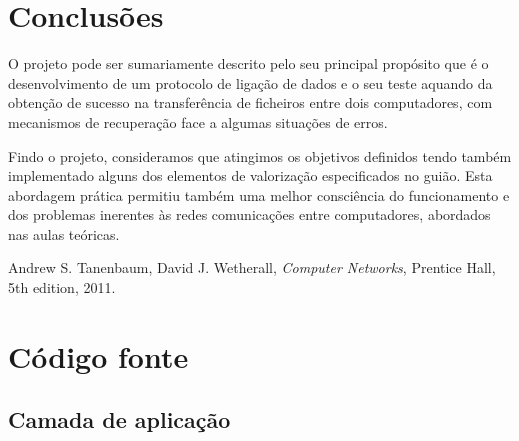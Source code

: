 \documentclass[a4paper,11pt,titlepage]{article}
\begin{document}
\section{Conclusões}

O projeto pode ser sumariamente descrito pelo seu principal propósito que é o desenvolvimento de um protocolo de ligação de dados e o seu teste aquando da obtenção de sucesso na transferência de ficheiros entre dois computadores, com mecanismos de recuperação face a algumas situações de erros. 

Findo o projeto, consideramos que atingimos os objetivos definidos tendo também implementado alguns dos elementos de valorização especificados no guião. Esta abordagem prática permitiu também uma melhor consciência do funcionamento e dos problemas inerentes às redes comunicações entre computadores, abordados nas aulas teóricas.

\begin{thebibliography}{9}
  Andrew S. Tanenbaum,
  David J. Wetherall,
  \emph{Computer Networks},
  Prentice Hall, 
  5th edition,
  2011.
\end{thebibliography}

\appendix
\section{Código fonte}
\subsection{Camada de aplicação}
\end{document}
